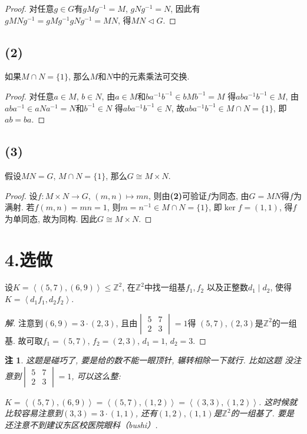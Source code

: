 \documentclass[12pt, a4paper, fontset=windows]{ctexart}
\newcommand{\Z}{\mathbb{Z}}
\newcommand{\gen}[1]{\left\langle{#1}\right\rangle}
\newcommand{\isom}{\cong} %
\newcommand{\kh}[1]{（{#1}）} %
\newcommand{\xuan}{{\normalsize 选做}}
\def\vmat#1{\begin{vmatrix}#1\end{vmatrix}}
\newtheorem*{remark}{注}
\newenvironment{solution}{\begin{proof}[解]}{\end{proof}}
\begin{document}
\begin{proof}
对任意$g\in G$有$gMg^{-1}=M$, $gNg^{-1}=N$, 因此有
$gMNg^{-1}=gMg^{-1}gNg^{-1}=MN$, 得$MN\lhd G$. 
\end{proof}

\subsection*{(2)}

如果$M\cap N=\{1\}$, 那么$M$和$N$中的元素乘法可交换. 

\begin{proof}
对任意$a\in M$, $b\in N$, 由$a\in M$和$ba^{-1}b^{-1}\in bMb^{-1}=M$
得$aba^{-1}b^{-1}\in M$, 由$aba^{-1}\in aNa^{-1}=N$和$b^{-1}\in N$
得$aba^{-1}b^{-1}\in N$, 故$aba^{-1}b^{-1}\in M\cap N=\{1\}$, 即$ab=ba$. 
\end{proof}

\subsection*{(3)}

假设$MN=G$, $M\cap N=\{1\}$, 那么$G\isom M\times N$. 

\begin{proof}
设$f:M\times N\to G$, $(m,n)\mapsto mn$, 则由{\bf (2)}可验证$f$为同态, 由$G=MN$得$f$为满射. 
若$f(m,n)=mn=1$, 则$m=n^{-1}\in M\cap N=\{1\}$, 即$\ker f=(1,1)$, 
得$f$为单同态, 故为同构. 因此$G\isom M\times N$. 
\end{proof}

\section*{4.\xuan}
\label{5769}

设$K=\gen{(5,7),(6,9)}\le\Z^2$, 在$\Z^2$中找一组基$f_1,f_2$
以及正整数$d_1\mid d_2$, 使得$K=\gen{d_1f_1,d_2f_2}$. 

\begin{solution}
注意到$(6,9)=3\cdot(2,3)$, 且由$\vmat{5&7\\2&3}=1$得
$(5,7),(2,3)$是$\Z^2$的一组基. 故可取$f_1=(5,7)$, 
$f_2=(2,3)$, $d_1=1$, $d_2=3$. 
\end{solution}

\begin{remark}
这题是碰巧了, 要是给的数不能一眼顶针, 辗转相除一下就行. 比如这题
没注意到$\vmat{5&7\\2&3}=1$, 可以这么整: 

$K=\gen{(5,7),(6,9)}=\gen{(5,7),(1,2)}=\gen{(3,3),(1,2)}$. 
这时候就比较容易注意到$(3,3)=3\cdot(1,1)$, 
还有$(1,2),(1,1)$是$\Z^2$的一组基了. 
要是还注意不到建议东区校医院眼科\kh{\sf bushi}. 
\end{remark}
\end{document}
